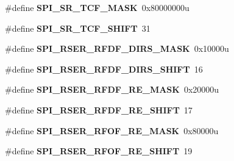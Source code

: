 \begin{DoxyCompactItemize}
\item 
\#define {\bfseries S\+P\+I\+\_\+\+S\+R\+\_\+\+T\+C\+F\+\_\+\+M\+A\+SK}~0x80000000u\hypertarget{group__SPI__Register__Masks_ga3142ac7389c847b78c8f42e6bad5eec1}{}\label{group__SPI__Register__Masks_ga3142ac7389c847b78c8f42e6bad5eec1}

\item 
\#define {\bfseries S\+P\+I\+\_\+\+S\+R\+\_\+\+T\+C\+F\+\_\+\+S\+H\+I\+FT}~31\hypertarget{group__SPI__Register__Masks_ga4edd10f93f07c7b2edfbac31c1d4ebf5}{}\label{group__SPI__Register__Masks_ga4edd10f93f07c7b2edfbac31c1d4ebf5}

\item 
\#define {\bfseries S\+P\+I\+\_\+\+R\+S\+E\+R\+\_\+\+R\+F\+D\+F\+\_\+\+D\+I\+R\+S\+\_\+\+M\+A\+SK}~0x10000u\hypertarget{group__SPI__Register__Masks_ga10709e9e15464e94d63f2034df58cd32}{}\label{group__SPI__Register__Masks_ga10709e9e15464e94d63f2034df58cd32}

\item 
\#define {\bfseries S\+P\+I\+\_\+\+R\+S\+E\+R\+\_\+\+R\+F\+D\+F\+\_\+\+D\+I\+R\+S\+\_\+\+S\+H\+I\+FT}~16\hypertarget{group__SPI__Register__Masks_ga1abe68cebab13a4018f43162098e4cd6}{}\label{group__SPI__Register__Masks_ga1abe68cebab13a4018f43162098e4cd6}

\item 
\#define {\bfseries S\+P\+I\+\_\+\+R\+S\+E\+R\+\_\+\+R\+F\+D\+F\+\_\+\+R\+E\+\_\+\+M\+A\+SK}~0x20000u\hypertarget{group__SPI__Register__Masks_ga5b78af7a1292fc0e0b4b39a92a4140b2}{}\label{group__SPI__Register__Masks_ga5b78af7a1292fc0e0b4b39a92a4140b2}

\item 
\#define {\bfseries S\+P\+I\+\_\+\+R\+S\+E\+R\+\_\+\+R\+F\+D\+F\+\_\+\+R\+E\+\_\+\+S\+H\+I\+FT}~17\hypertarget{group__SPI__Register__Masks_ga39481cbcda158bbfc6640eb07d0c2276}{}\label{group__SPI__Register__Masks_ga39481cbcda158bbfc6640eb07d0c2276}

\item 
\#define {\bfseries S\+P\+I\+\_\+\+R\+S\+E\+R\+\_\+\+R\+F\+O\+F\+\_\+\+R\+E\+\_\+\+M\+A\+SK}~0x80000u\hypertarget{group__SPI__Register__Masks_ga32d8083bb571fb12a424b1803c596f47}{}\label{group__SPI__Register__Masks_ga32d8083bb571fb12a424b1803c596f47}

\item 
\#define {\bfseries S\+P\+I\+\_\+\+R\+S\+E\+R\+\_\+\+R\+F\+O\+F\+\_\+\+R\+E\+\_\+\+S\+H\+I\+FT}~19\hypertarget{group__SPI__Register__Masks_gab18f888cf02c471809ebc9f807711a13}{}\label{group__SPI__Register__Masks_gab18f888cf02c471809ebc9f807711a13}


\end{DoxyCompactItemize}
